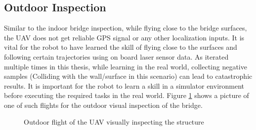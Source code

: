 \documentclass[12pt]{report}
\begin{document}
\subsection{Outdoor Inspection}
Similar to the indoor bridge inspection, while flying close to the bridge surfaces, the UAV does not get reliable GPS signal or any other localization inputs. It is vital for the robot to have learned the skill of flying close to the surfaces and following certain trajectories using on board laser sensor data. As iterated multiple times in this thesis, while learning in the real world, collecting negative samples (Colliding with the wall/surface in this scenario) can lead to catastrophic results. It is important for the robot to learn a skill in a simulator environment before executing the required tasks in the real world.
Figure \ref{fig:outdoor_flight} shows a picture of one of such flights for the outdoor visual inspection of the bridge. 
\begin{figure}[htp]
	\centering 
	\caption{Outdoor flight of the UAV visually inspecting the structure}
   \label{fig:outdoor_flight}
\end{figure}

\end{document}

